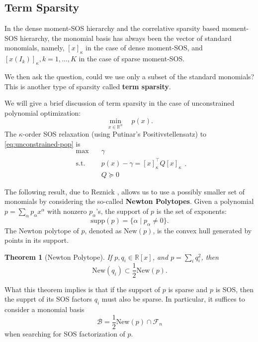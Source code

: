 \documentclass[
]{book}
\newtheorem{theorem}{Theorem}[chapter]
\theoremstyle{definition}
\theoremstyle{definition}
\theoremstyle{definition}
\theoremstyle{definition}
\theoremstyle{remark}
\begin{document}
\subsection{Term Sparsity}\label{term-sparsity}

In the dense moment-SOS hierarchy and the correlative sparsity based moment-SOS hierarchy, the monomial basis has always been the vector of standard monomials, namely, \([x]_{\kappa}\) in the case of dense moment-SOS, and \([x(I_k)]_{\kappa},k=1,\dots,K\) in the case of sparse moment-SOS.

We then ask the question, could we use only a subset of the standard monomials? This is another type of sparsity called \textbf{term sparsity}.

We will give a brief discussion of term sparsity in the case of unconstrained polynomial optimization:
\begin{equation}
\min_{x \in \mathbb{R}^{n}} \quad p(x).
\label{eq:unconstrained-pop}
\end{equation}
The \(\kappa\)-order SOS relaxation (using Putinar's Positivstellensatz) to \eqref{eq:unconstrained-pop} is
\begin{equation}
\begin{split}
\max & \quad \gamma \\
\mathrm{s.t.}& \quad p(x) - \gamma = [x]_\kappa^\top Q [x]_\kappa \\
& \quad Q \succeq 0
\end{split}.
\label{eq:unconstrained-pop-sos}
\end{equation}

The following result, due to Reznick \citep{reznick78-extremal}, allows us to use a possibly smaller set of monomials by considering the so-called \textbf{Newton Polytopes}. Given a polynomial \(p = \sum_{\alpha} p_\alpha x^{\alpha}\) with nonzero \(p_\alpha\)'s, the support of \(p\) is the set of exponents:
\[
\mathrm{supp}(p) = \{ \alpha \mid p_\alpha \neq 0 \}.
\]
The Newton polytope of \(p\), denoted as \(\mathrm{New}(p)\), is the convex hull generated by points in its support.

\begin{theorem}[Newton Polytope]
\protect\hypertarget{thm:NewtonPolytope}{}\label{thm:NewtonPolytope}If \(p, q_i \in \mathbb{R}[x]\), and \(p = \sum_i q_i^2\), then
\[
\mathrm{New}(q_i) \subset \frac{1}{2} \mathrm{New}(p).
\]
\end{theorem}

What this theorem implies is that if the support of \(p\) is sparse and \(p\) is SOS, then the supprt of its SOS factors \(q_i\) must also be sparse. In particular, it suffices to consider a monomial basis
\begin{equation}
\mathcal{B}= \frac{1}{2} \mathrm{New}(p) \cap \mathcal{F}_n
\label{eq:Newton-polytope}
\end{equation}
when searching for SOS factorization of \(p\).
\end{document}
